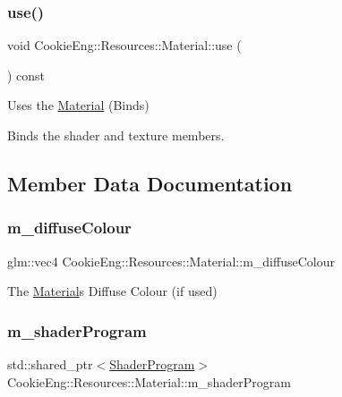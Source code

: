 \subsubsection{\texorpdfstring{use()}{use()}}
{\footnotesize\ttfamily void Cookie\+Eng\+::\+Resources\+::\+Material\+::use (\begin{DoxyParamCaption}{ }\end{DoxyParamCaption}) const}



Uses the \hyperlink{class_cookie_eng_1_1_resources_1_1_material}{Material} (Binds) 

Binds the shader and texture members. 

\subsection{Member Data Documentation}
\mbox{\label{class_cookie_eng_1_1_resources_1_1_material_abbf6212e6e8c5e341f20628cd2c3aea2}} 
\subsubsection{\texorpdfstring{m\+\_\+diffuse\+Colour}{m\_diffuseColour}}
{\footnotesize\ttfamily glm\+::vec4 Cookie\+Eng\+::\+Resources\+::\+Material\+::m\+\_\+diffuse\+Colour\hspace{0.3cm}{\ttfamily [protected]}}

The \hyperlink{class_cookie_eng_1_1_resources_1_1_material}{Material}\textquotesingle{}s Diffuse Colour (if used) \mbox{\label{class_cookie_eng_1_1_resources_1_1_material_acb45c40912ababa7776c666af13b1f3f}} 
\subsubsection{\texorpdfstring{m\+\_\+shader\+Program}{m\_shaderProgram}}
{\footnotesize\ttfamily std\+::shared\+\_\+ptr$<$\hyperlink{class_cookie_eng_1_1_resources_1_1_shader_program}{Shader\+Program}$>$ Cookie\+Eng\+::\+Resources\+::\+Material\+::m\+\_\+shader\+Program\hspace{0.3cm}{\ttfamily [protected]}}

